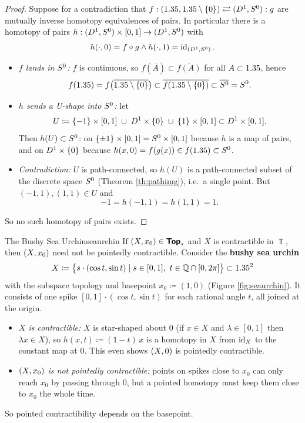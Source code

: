 \begin{proof}
  Suppose for a contradiction that $f:(1.35,1.35\setminus\{0\})\rightleftarrows(D^{1},S^{0}):g$ are mutually inverse homotopy equivalences of pairs. In particular there is a homotopy of pairs $h:(D^{1},S^{0})\times[0,1]\to(D^{1},S^{0})$ with \[
    h(\cdot,0)=f\circ g\land h(\cdot,1)=\operatorname{id}_{(D^{1},S^{0})}.
  \]
  \begin{itemize}
    \item \emph{$f$ lands in $S^{0}$:} $f$ is continuous, so $f(\overline{A})\subset\overline{f(A)}$ for all $A\subset1.35$, hence \[
      f(1.35)=f\big(\overline{1.35\setminus\{0\}}\big)\subset\overline{f(1.35\setminus\{0\})}\subset\overline{S^{0}}=S^{0}.
    \]
    \item \emph{$h$ sends a U-shape into $S^{0}$:} let \[
      U\coloneqq\{-1\}\times[0,1]\;\cup\;D^{1}\times\{0\}\;\cup\;\{1\}\times[0,1]\subset D^{1}\times[0,1].
    \]
    Then $h(U)\subset S^{0}$: on $\{\pm1\}\times[0,1]=S^{0}\times[0,1]$ because $h$ is a map of pairs, and on $D^{1}\times\{0\}$ because $h(x,0)=f(g(x))\in f(1.35)\subset S^{0}$.
    \item \emph{Contradiction:} $U$ is path-connected, so $h(U)$ is a path-connected subset of the discrete space $S^{0}$ (Theorem \ref{th:pathimg}), i.e.\ a single point. But $(-1,1),(1,1)\in U$ and \[
      -1=h(-1,1)=h(1,1)=1.
    \]
  \end{itemize}
  So no such homotopy of pairs exists.
\end{proof}

\begin{example}{The Bushy Sea Urchin}{seaurchin}
  If $\left(X,x_0\right)\in\bm{\mathsf{Top}}_*$ and $X$ is contractible in $\Top$, then $\left(X,x_0\right)$ need not be pointedly contractible. Consider the \textbf{bushy sea urchin} \[
    X\coloneqq\big\{s\cdot(\cos t,\sin t)\mid s\in[0,1],\ t\in\mathbb{Q}\cap[0,2\pi]\big\}\subset1.35^2
  \]
  with the subspace topology and basepoint $x_0\coloneqq(1,0)$ (Figure \ref{fig:seaurchin}). It consists of one spike $[0,1]\cdot(\cos t,\sin t)$ for each rational angle $t$, all joined at the origin.
  \begin{itemize}
    \item \emph{$X$ is contractible:} $X$ is star-shaped about $0$ (if $x\in X$ and $\lambda\in[0,1]$ then $\lambda x\in X$), so $h(x,t)\coloneqq(1-t)\,x$ is a homotopy in $X$ from $\operatorname{id}_X$ to the constant map at $0$. This even shows $\left(X,0\right)$ is pointedly contractible.
    \item \emph{$\left(X,x_0\right)$ is not pointedly contractible:} points on spikes close to $x_0$ can only reach $x_0$ by passing through $0$, but a pointed homotopy must keep them close to $x_0$ the whole time.
  \end{itemize}
  So pointed contractibility depends on the basepoint.
\end{example}

